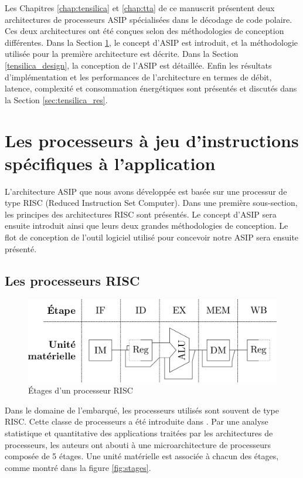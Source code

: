 Les Chapitres \ref{chap:tensilica} et \ref{chap:tta} de ce manuscrit présentent deux architectures de processeurs ASIP spécialisées dans le décodage de code polaire. Ces deux architectures ont été conçues selon des méthodologies de conception différentes. Dans la Section \ref{sec:asips}, le concept d'ASIP est introduit, et la méthodologie utilisée pour la première architecture est décrite. Dans la Section \ref{tensilica_design}, la conception de l'ASIP est détaillée. Enfin les résultats d'implémentation et les performances de l'architecture en termes de débit, latence, complexité et consommation énergétiques sont présentés et discutés dans la Section \ref{sec:tensilica_res}.


\section{Les processeurs à jeu d'instructions spécifiques à l'application}
\label{sec:asips}

L'architecture ASIP que nous avons développée est basée sur une processur de type RISC (Reduced Instruction Set Computer). Dans une première sous-section, les principes des architectures RISC sont présentés. Le concept d'ASIP sera ensuite introduit ainsi que leurs deux grandes méthodologies de conception. Le flot de conception de l'outil logiciel utilisé pour concevoir notre ASIP sera ensuite présenté.

\subsection{Les processeurs RISC}
\label{subsec:risc}
\begin{figure}[t]
\centering
\includegraphics[width=\textwidth]{main/ch3_fig/stages}
\caption{\'Etages d'un processeur RISC}
\label{fig:risc}
\end{figure}

Dans le domaine de l'embarqué, les processeurs utilisés sont souvent de type RISC. Cette classe de processeurs a été introduite dans \cite{hennessy2011computer}. Par une analyse statistique et quantitative des applications traitées par les architectures de processeurs, les auteurs ont abouti à une microarchitecture de processeurs composée de 5 étages. Une unité matérielle est associée à chacun des étages, comme montré dans la figure \ref{fig:stages}.

